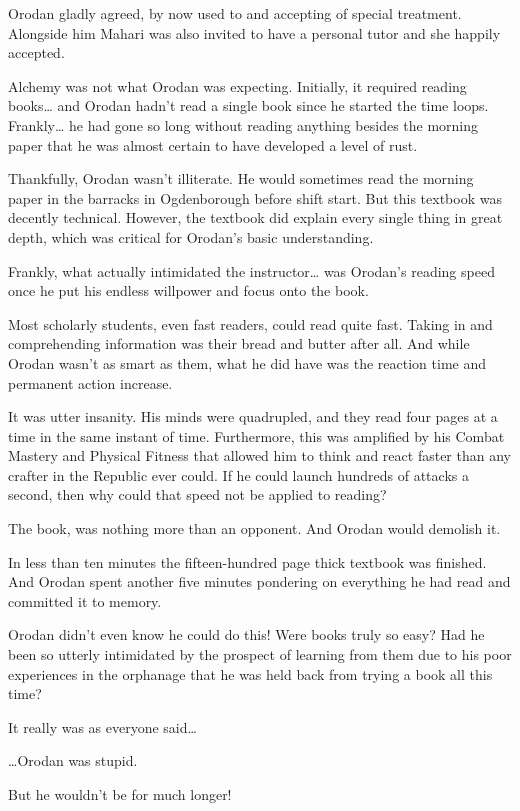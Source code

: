 \documentclass[a4paper,10pt]{book}
\begin{document}
Orodan gladly agreed, by now used to and accepting of special treatment. Alongside him Mahari was also invited to have a personal tutor and she happily accepted.\par
Alchemy was not what Orodan was expecting. Initially, it required reading books… and Orodan hadn’t read a single book since he started the time loops. Frankly… he had gone so long without reading anything besides the morning paper that he was almost certain to have developed a level of rust.\par
Thankfully, Orodan wasn’t illiterate. He would sometimes read the morning paper in the barracks in Ogdenborough before shift start. But this textbook was decently technical. However, the textbook did explain every single thing in great depth, which was critical for Orodan’s basic understanding.\par
Frankly, what actually intimidated the instructor… was Orodan’s reading speed once he put his endless willpower and focus onto the book.\par
Most scholarly students, even fast readers, could read quite fast. Taking in and comprehending information was their bread and butter after all. And while Orodan wasn’t as smart as them, what he did have was the reaction time and permanent action increase.\par
It was utter insanity. His minds were quadrupled, and they read four pages at a time in the same instant of time. Furthermore, this was amplified by his Combat Mastery and Physical Fitness that allowed him to think and react faster than any crafter in the Republic ever could. If he could launch hundreds of attacks a second, then why could that speed not be applied to reading?\par
The book, was nothing more than an opponent. And Orodan would demolish it.\par
In less than ten minutes the fifteen-hundred page thick textbook was finished. And Orodan spent another five minutes pondering on everything he had read and committed it to memory.\par
Orodan didn’t even know he could do this! Were books truly so easy? Had he been so utterly intimidated by the prospect of learning from them due to his poor experiences in the orphanage that he was held back from trying a book all this time?\par
It really was as everyone said…\par
…Orodan was stupid.\par
But he wouldn’t be for much longer!\par
\end{document}

